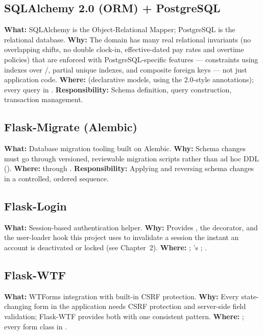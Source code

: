 \subsection*{SQLAlchemy 2.0 (ORM) + PostgreSQL}
\textbf{What:} SQLAlchemy is the Object-Relational Mapper; PostgreSQL is
the relational database.
\textbf{Why:} The domain has many real relational invariants (no
overlapping shifts, no double clock-in, effective-dated pay rates and
overtime policies) that are enforced with PostgreSQL-specific features
---  constraints using  indexes over
/, partial unique indexes, and
composite foreign keys --- not just application code.
\textbf{Where:}  (declarative models, using the
2.0-style  annotations); every 
query in .
\textbf{Responsibility:} Schema definition, query construction,
transaction management.

\subsection*{Flask-Migrate (Alembic)}
\textbf{What:} Database migration tooling built on Alembic.
\textbf{Why:} Schema changes must go through versioned, reviewable
migration scripts rather than ad hoc DDL ().
\textbf{Where:}  through .
\textbf{Responsibility:} Applying and reversing schema changes in a
controlled, ordered sequence.

\subsection*{Flask-Login}
\textbf{What:} Session-based authentication helper.
\textbf{Why:} Provides , the 
decorator, and the user-loader hook this project uses to invalidate a
session the instant an account is deactivated or locked (see
Chapter~2).
\textbf{Where:} ;
's ; .

\subsection*{Flask-WTF}
\textbf{What:} WTForms integration with built-in CSRF protection.
\textbf{Why:} Every state-changing form in the application needs CSRF
protection and server-side field validation; Flask-WTF provides both
with one consistent pattern.
\textbf{Where:} ; every form class in
.

